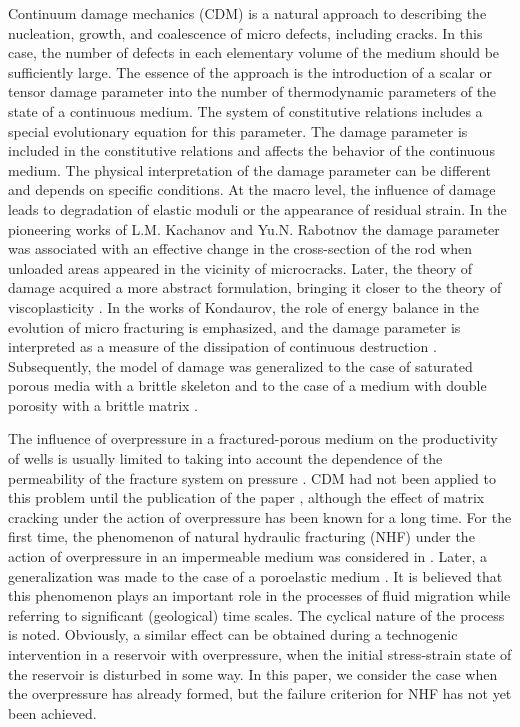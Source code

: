 \documentclass[article,authoryear,jpm]{beg_39}             %
\begin{document}
Continuum damage mechanics (CDM) is a natural approach to describing the nucleation, growth, and coalescence of micro defects, including cracks.
In this case, the number of defects in each elementary volume of the medium should be sufficiently large.
The essence of the approach is the introduction of a scalar or tensor damage parameter into the number of thermodynamic parameters of the state of a continuous medium.
The system of constitutive relations includes a special evolutionary equation for this parameter.
The damage parameter is included in the constitutive relations and affects the behavior of the continuous medium.
The physical interpretation of the damage parameter can be different and depends on specific conditions.
At the macro level, the influence of damage leads to degradation of elastic moduli or the appearance of residual strain.
In the pioneering works of L.M.
Kachanov and Yu.N.
Rabotnov the damage parameter was associated with an effective change in the cross-section of the rod when unloaded areas appeared in the vicinity of microcracks.
Later, the theory of damage acquired a more abstract formulation, bringing it closer to the theory of viscoplasticity \cite{Lemaitre, Murakami}.
In the works of Kondaurov, the role of energy balance in the evolution of micro fracturing is emphasized, and the damage parameter is interpreted as a measure of the dissipation of continuous destruction \cite{Kondaurov2002}.
Subsequently, the model of damage was generalized to the case of saturated porous media with a brittle skeleton \cite{Izvekov} and to the case of a medium with double porosity with a brittle matrix \cite{Izvekov2020}.


The influence of overpressure in a fractured-porous medium on the productivity of wells is usually limited to taking into account the dependence of the permeability of the fracture system on pressure \cite{Thompson}.
CDM had not been applied to this problem until the publication of the paper \cite{Izvekov2020}, although the effect of matrix cracking under the action of overpressure has been known for a long time.
For the first time, the phenomenon of natural hydraulic fracturing (NHF) under the action of overpressure in an impermeable medium was considered in \cite{Secor}.
Later, a generalization was made to the case of a poroelastic medium \cite{Engelder, Luo}.
It is believed that this phenomenon plays an important role in the processes of fluid migration while referring to significant (geological) time scales.
The cyclical nature of the process is noted.
Obviously, a similar effect can be obtained during a technogenic intervention in a reservoir with overpressure, when the initial stress-strain state of the reservoir is disturbed in some way.
In this paper, we consider the case when the overpressure has already formed, but the failure criterion for NHF has not yet been achieved.
\end{document}
